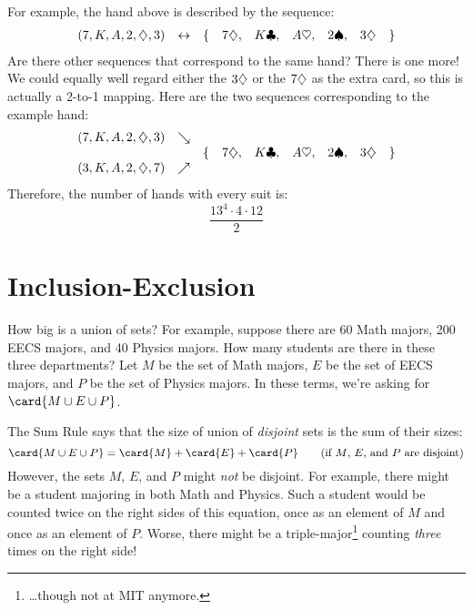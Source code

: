 For example, the hand above is described by the sequence:
%
\[
\begin{array}{rcrcccccl}
(7, K, A, 2, \diamondsuit, 3) & \leftrightarrow &
    \{ & 7 \diamondsuit, & K \clubsuit, & A \heartsuit, & 2 \spadesuit, & 3 \diamondsuit & \}
\end{array}
\]
%
Are there other sequences that correspond to the same hand?  There is
one more!  We could equally well regard either the $3 \diamondsuit$ or the $7
\diamondsuit$ as the extra card, so this is actually a 2-to-1 mapping.  Here
are the two sequences corresponding to the example hand:
%
\[
\begin{array}{rcrcccccl}
(7, K, A, 2, \diamondsuit, 3) & \searrow & \\
 && \{ & 7 \diamondsuit, & K \clubsuit, & A \heartsuit, & 2 \spadesuit, & 3 \diamondsuit & \} \\
(3, K, A, 2, \diamondsuit, 7) & \nearrow &
\end{array}
\]
%
Therefore, the number of hands with every suit is:
%
\[
\frac{13^4 \cdot 4 \cdot 12}{2}
\]

\begin{problems}
\classproblems
{}
\end{problems}



{\section{Inclusion-Exclusion}}

How big is a union of sets?  For example, suppose there are 60 Math
majors, 200 EECS majors, and 40 Physics majors.  How many students are
there in these three departments?  Let $M$ be the set of Math majors,
$E$ be the set of EECS majors, and $P$ be the set of Physics majors.  In
these terms, we're asking for $\card{M \cup E \cup P}$.

The Sum Rule says that the size of union of \emph{disjoint} sets is
the sum of their sizes:
%
\[
\card{M \cup E \cup P} = \card{M} + \card{E} + \card{P}
    \qquad \text{(if $M$, $E$, and $P$ are disjoint)}
\]
%
However, the sets $M$, $E$, and $P$ might \emph{not} be disjoint.  For
example, there might be a student majoring in both Math and
Physics.  Such a student would be counted twice on the right sides of this
equation, once as an element of $M$ and once as an element of $P$.  Worse,
there might be a triple-major\footnote{\dots though not at MIT anymore.}
counting \emph{three} times on the right side!

